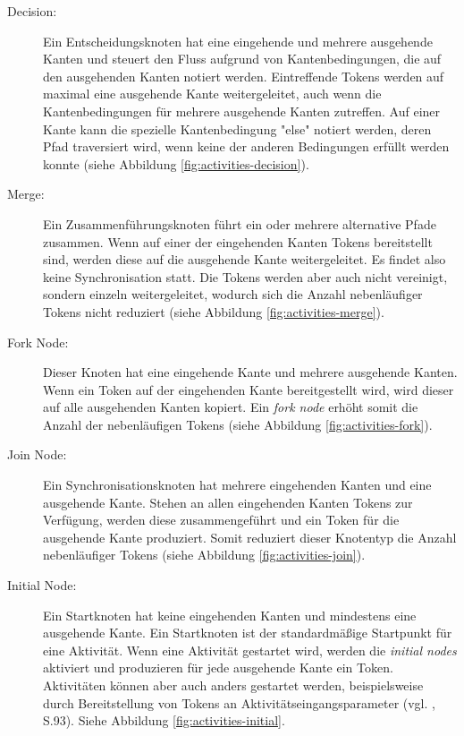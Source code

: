 \begin{description}
\item[Decision:] Ein Entscheidungsknoten hat eine eingehende und mehrere ausgehende Kanten und steuert den Fluss aufgrund von Kantenbedingungen, die auf den ausgehenden Kanten notiert werden. Eintreffende Tokens werden auf maximal eine ausgehende Kante weitergeleitet, auch wenn die Kantenbedingungen für mehrere ausgehende Kanten zutreffen. Auf einer Kante kann die spezielle Kantenbedingung "else" notiert werden, deren Pfad traversiert wird, wenn keine der anderen Bedingungen erfüllt werden konnte (siehe Abbildung \ref{fig:activities-decision}).

\item[Merge:] Ein Zusammenführungsknoten führt ein oder mehrere alternative Pfade zusammen. Wenn auf einer der eingehenden Kanten Tokens bereitstellt sind, werden diese auf die ausgehende Kante weitergeleitet. Es findet also keine Synchronisation statt. Die Tokens werden aber auch nicht vereinigt, sondern einzeln weitergeleitet, wodurch sich die Anzahl nebenläufiger Tokens nicht reduziert (siehe Abbildung \ref{fig:activities-merge}).

\item[Fork Node:] Dieser Knoten hat eine eingehende Kante und mehrere ausgehende Kanten. Wenn ein Token auf der eingehenden Kante bereitgestellt wird, wird dieser auf alle ausgehenden Kanten kopiert. Ein \emph{fork node} erhöht somit die Anzahl der nebenläufigen Tokens (siehe Abbildung \ref{fig:activities-fork}).

\item[Join Node:] Ein Synchronisationsknoten hat mehrere eingehenden Kanten und eine ausgehende Kante. Stehen an allen eingehenden Kanten Tokens zur Verfügung, werden diese zusammengeführt und ein Token für die ausgehende Kante produziert. Somit reduziert dieser Knotentyp die Anzahl nebenläufiger Tokens (siehe Abbildung \ref{fig:activities-join}).

\item[Initial Node:] Ein Startknoten hat keine eingehenden Kanten und mindestens eine ausgehende Kante. Ein Startknoten ist der standardmäßige Startpunkt für eine Aktivität. Wenn eine Aktivität gestartet wird, werden die \emph{initial nodes} aktiviert und produzieren für jede ausgehende Kante ein Token. Aktivitäten können aber auch anders gestartet werden, beispielsweise durch Bereitstellung von Tokens an Aktivitätseingangsparameter (vgl. \citep{WeilkiensOestereich2004}, S.93). Siehe Abbildung \ref{fig:activities-initial}.


\end{description}
